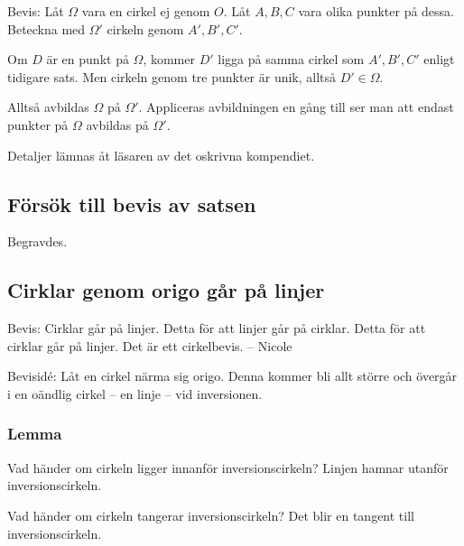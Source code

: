 Bevis: Låt $\Omega$ vara en cirkel ej genom $O$. 
Låt $A,B,C$ vara olika punkter på dessa.
Beteckna med $\Omega'$ cirkeln genom $A',B',C'$.

Om $D$ är en punkt på $\Omega$, kommer $D'$ ligga på samma cirkel som $A',B',C'$ enligt tidigare sats. Men cirkeln genom tre punkter är unik, alltså $D' \in \Omega$.

Alltså avbildas $\Omega$ på $\Omega'$. Appliceras avbildningen en gång till ser man att endast punkter på $\Omega$ avbildas på $\Omega'$. 

Detaljer lämnas åt läsaren av det oskrivna kompendiet.

\subsection{Försök till bevis av satsen}
Begravdes.

\subsection{Cirklar genom origo går på linjer}
Bevis: Cirklar går på linjer. Detta för att linjer går på cirklar. Detta för att cirklar går på linjer. Det är ett cirkelbevis. -- Nicole

Bevisidé:
Låt en cirkel närma sig origo. Denna kommer bli allt större och övergår i en oändlig cirkel -- en linje -- vid inversionen.

\subsubsection{Lemma}
Vad händer om cirkeln ligger innanför inversionscirkeln? Linjen hamnar utanför inversionscirkeln.

Vad händer om cirkeln tangerar inversionscirkeln? Det blir en tangent till inversionscirkeln.

